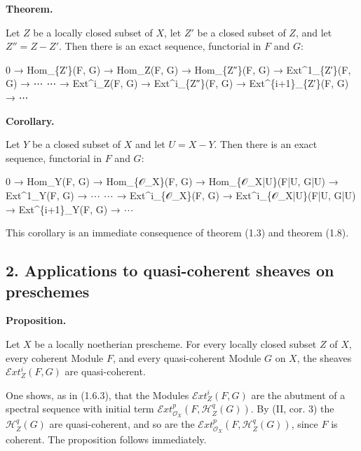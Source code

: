 \documentclass[
]{article}
\newenvironment{Shaded}{}{}
\newcommand{\NormalTok}[1]{#1}
\begin{document}
\textbf{Theorem.}

Let \(Z\) be a locally closed subset of \(X\), let \(Z'\) be a closed
subset of \(Z\), and let \(Z'' = Z - Z'\). Then there is an exact
sequence, functorial in \(F\) and \(G\):

\begin{Shaded}
\begin{Highlighting}[]
\NormalTok{0 → Hom\_\{Z′\}(F, G) → Hom\_Z(F, G) → Hom\_\{Z″\}(F, G) → Ext\^{}1\_\{Z′\}(F, G) → ⋯}
\NormalTok{    ⋯ → Ext\^{}i\_Z(F, G) → Ext\^{}i\_\{Z″\}(F, G) → Ext\^{}\{i+1\}\_\{Z′\}(F, G) → ⋯}
\end{Highlighting}
\end{Shaded}

\textbf{Corollary.}

Let \(Y\) be a closed subset of \(X\) and let \(U = X - Y\). Then there
is an exact sequence, functorial in \(F\) and \(G\):

\begin{Shaded}
\begin{Highlighting}[]
\NormalTok{0 → Hom\_Y(F, G) → Hom\_\{𝒪\_X\}(F, G) → Hom\_\{𝒪\_X|U\}(F|U, G|U) → Ext\^{}1\_Y(F, G) → ⋯}
\NormalTok{    ⋯ → Ext\^{}i\_\{𝒪\_X\}(F, G) → Ext\^{}i\_\{𝒪\_X|U\}(F|U, G|U) → Ext\^{}\{i+1\}\_Y(F, G) → ⋯}
\end{Highlighting}
\end{Shaded}

This corollary is an immediate consequence of theorem (1.3) and theorem
(1.8).

\subsection{2. Applications to quasi-coherent sheaves on
preschemes}\label{applications-to-quasi-coherent-sheaves-on-preschemes}

\textbf{Proposition.}

Let \(X\) be a locally noetherian prescheme. For every locally closed
subset \(Z\) of \(X\), every coherent Module \(F\), and every
quasi-coherent Module \(G\) on \(X\), the sheaves
\(\mathcal{E}xt^{i}_{Z}(F, G)\) are quasi-coherent.

One shows, as in (1.6.3), that the Modules
\(\mathcal{E}xt^{i}_{Z}(F, G)\) are the abutment of a spectral sequence
with initial term
\(\mathcal{E}xt^{p}_{\mathcal{O}_{X}}(F, \mathcal{H}^{q}_{Z}(G))\). By
(II, cor. 3) the \(\mathcal{H}^{q}_{Z}(G)\) are quasi-coherent, and so
are the
\(\mathcal{E}xt^{p}_{\mathcal{O}_{X}}(F, \mathcal{H}^{q}_{Z}(G))\),
since \(F\) is coherent. The proposition follows immediately.
\end{document}
